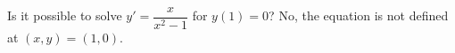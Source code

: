 {Is it possible to solve $y' = \dfrac{x}{x^2-1}$ for $y(1) = 0$?}
{No, the equation is not defined at $(x,y) = (1,0)$.}